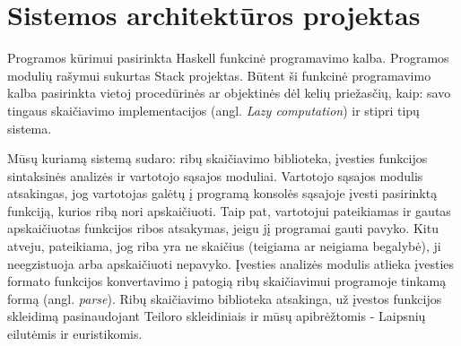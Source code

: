 \section{Sistemos architektūros projektas}

Programos kūrimui pasirinkta Haskell funkcinė programavimo kalba.
Programos modulių rašymui sukurtas Stack projektas. 
Būtent ši funkcinė programavimo kalba pasirinkta vietoj procedūrinės ar objektinės dėl kelių priežasčių, kaip: 
savo tingaus skaičiavimo implementacijos (angl. \textit{Lazy computation}) ir stipri tipų sistema. 
 
Mūsų kuriamą sistemą sudaro: ribų skaičiavimo biblioteka, įvesties funkcijos sintaksinės analizės ir vartotojo sąsajos moduliai. 
Vartotojo sąsajos modulis atsakingas, jog vartotojas galėtų į programą konsolės sąsajoje 
įvesti pasirinktą funkciją, kurios ribą nori apskaičiuoti. 
Taip pat, vartotojui pateikiamas ir gautas apskaičiuotas funkcijos ribos atsakymas, jeigu jį programai gauti pavyko. 
Kitu atveju, pateikiama, jog riba yra ne skaičius (teigiama ar neigiama begalybė), ji neegzistuoja arba apskaičiuoti nepavyko.
Įvesties analizės modulis atlieka įvesties formato funkcijos konvertavimo į 
patogią ribų skaičiavimui programoje tinkamą formą (angl. \textit{parse}). 
Ribų skaičiavimo biblioteka atsakinga, už įvestos funkcijos skleidimą pasinaudojant Teiloro skleidiniais ir
mūsų apibrėžtomis - Laipsnių eilutėmis ir euristikomis.
